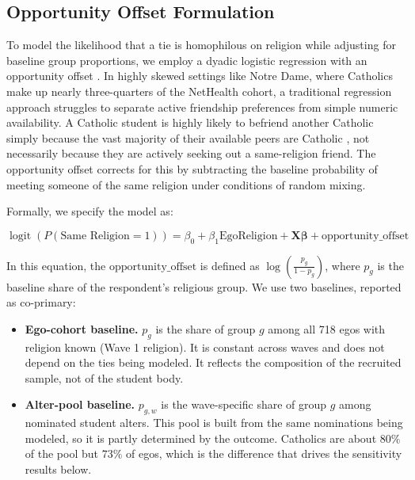 \documentclass[11pt]{article}
\begin{document}
\subsection{Opportunity Offset Formulation}

To model the likelihood that a tie is homophilous on religion while adjusting for baseline group proportions, we employ a dyadic logistic regression with an opportunity offset \citep{scott_wild91}. In highly skewed settings like Notre Dame, where Catholics make up nearly three-quarters of the NetHealth cohort, a traditional regression approach struggles to separate active friendship preferences from simple numeric availability. A Catholic student is highly likely to befriend another Catholic simply because the vast majority of their available peers are Catholic \citep{blau1977}, not necessarily because they are actively seeking out a same-religion friend. The opportunity offset corrects for this by subtracting the baseline probability of meeting someone of the same religion under conditions of random mixing.

Formally, we specify the model as:

\begin{equation}
\operatorname{logit}(P(\text{Same Religion} = 1)) = \beta_0 + \beta_1 \text{EgoReligion} + \mathbf{X}\mathbf{\beta} + \text{opportunity\_offset}
\end{equation}

In this equation, the $\text{opportunity\_offset}$ is defined as $\log\left(\frac{p_g}{1 - p_g}\right)$, where $p_g$ is the baseline share of the respondent's religious group. We use two baselines, reported as co-primary:

\begin{itemize}
\item \textbf{Ego-cohort baseline.} $p_g$ is the share of group $g$ among all 718 egos with religion known (Wave 1 religion). It is constant across waves and does not depend on the ties being modeled. It reflects the composition of the recruited sample, not of the student body.
\item \textbf{Alter-pool baseline.} $p_{g,w}$ is the wave-specific share of group $g$ among nominated student alters. This pool is built from the same nominations being modeled, so it is partly determined by the outcome. Catholics are about $80\%$ of the pool but $73\%$ of egos, which is the difference that drives the sensitivity results below.
\end{itemize}
\end{document}
